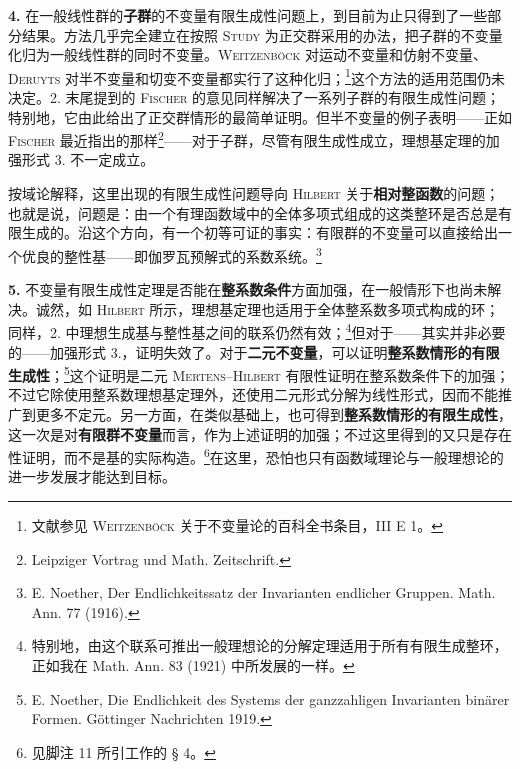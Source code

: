 \documentclass[11pt]{article}
\newcommand{\srcemph}[1]{\textbf{#1}}
\newcommand{\srcname}[1]{\textsc{#1}}
\begin{document}
\textbf{4.} 在一般线性群的\srcemph{子群}的不变量有限生成性问题上，到目前为止只得到了一些部分结果。方法几乎完全建立在按照 \srcname{Study} 为正交群采用的办法，把子群的不变量化归为一般线性群的同时不变量。\srcname{Weitzenböck} 对运动不变量和仿射不变量、\srcname{Deruyts} 对半不变量和切变不变量都实行了这种化归；\footnote{文献参见 \textsc{Weitzenböck} 关于不变量论的百科全书条目，III E 1。}这个方法的适用范围仍未决定。2. 末尾提到的 \srcname{Fischer} 的意见同样解决了一系列子群的有限生成性问题；特别地，它由此给出了正交群情形的最简单证明。但半不变量的例子表明——正如 \srcname{Fischer} 最近指出的那样\footnote{Leipziger Vortrag und Math. Zeitschrift.}——对于子群，尽管有限生成性成立，理想基定理的加强形式 3. 不一定成立。

按域论解释，这里出现的有限生成性问题导向 \srcname{Hilbert} 关于\srcemph{相对整函数}的问题；也就是说，问题是：由一个有理函数域中的全体多项式组成的这类整环是否总是有限生成的。沿这个方向，有一个初等可证的事实：有限群的不变量可以直接给出一个优良的整性基——即伽罗瓦预解式的系数系统。\footnote{E. Noether, Der Endlichkeitssatz der Invarianten endlicher Gruppen. Math. Ann. 77 (1916).}

\textbf{5.} 不变量有限生成性定理是否能在\srcemph{整系数条件}方面加强，在一般情形下也尚未解决。诚然，如 \srcname{Hilbert} 所示，理想基定理也适用于全体整系数多项式构成的环；同样，2. 中理想生成基与整性基之间的联系仍然有效；\footnote{特别地，由这个联系可推出一般理想论的分解定理适用于所有有限生成整环，正如我在 Math. Ann. 83 (1921) 中所发展的一样。}但对于——其实并非必要的——加强形式 3.，证明失效了。对于\srcemph{二元不变量}，可以证明\srcemph{整系数情形的有限生成性}；\footnote{E. Noether, Die Endlichkeit des Systems der ganzzahligen Invarianten binärer Formen. Göttinger Nachrichten 1919.}这个证明是二元 \srcname{Mertens--Hilbert} 有限性证明在整系数条件下的加强；不过它除使用整系数理想基定理外，还使用二元形式分解为线性形式，因而不能推广到更多不定元。另一方面，在类似基础上，也可得到\srcemph{整系数情形的有限生成性}，这一次是对\srcemph{有限群不变量}而言，作为上述证明的加强；不过这里得到的又只是存在性证明，而不是基的实际构造。\footnote{见脚注 11 所引工作的 § 4。}在这里，恐怕也只有函数域理论与一般理想论的进一步发展才能达到目标。
\end{document}
